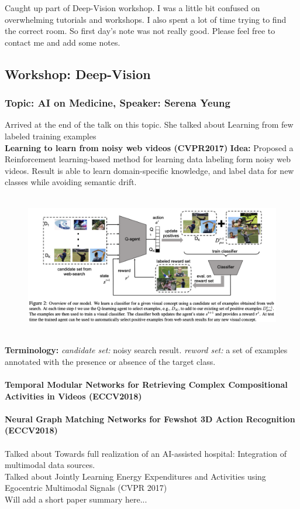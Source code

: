 Caught up part of Deep-Vision workshop. I was a little bit confused on overwhelming tutorials and workshops. I also spent a lot of time trying to find the correct room. So first day's note was not really good. Please feel free to contact me and add some notes.

\subsection{Workshop: Deep-Vision}
\subsubsection{Topic: AI on Medicine, Speaker: Serena Yeung}
Arrived at the end of the talk on this topic. She talked about Learning from few labeled training examples \\
\textbf{Learning to learn from noisy web videos (CVPR2017)}\newline
{\bf Idea:} Proposed a Reinforcement learning-based method for learning data labeling form noisy web videos. Result is able to learn domain-specific knowledge, and label data for new classes while avoiding semantic drift.\\
\\
\begin{figure}[]
    \centering
    \includegraphics[width=1\textwidth]{images/Image4.png}
    \label{fig:Conf_D1_1}
\end{figure}\\
{\bf Terminology:} \textit{candidate set:} noisy search result. \textit{reword set:} a set of examples annotated with the presence or absence of the target class.\\
\\
\textbf{Temporal Modular Networks for Retrieving Complex Compositional Activities in Videos (ECCV2018)}\\
\\
\textbf{Neural Graph Matching Networks for Fewshot 3D Action Recognition (ECCV2018)}\\
\\
Talked about Towards full realization of an AI-assisted hospital: Integration of multimodal data sources. \\
Talked about Jointly Learning Energy Expenditures and Activities using Egocentric Multimodal Signals (CVPR 2017) \\
Will add a short paper summary here... \\

